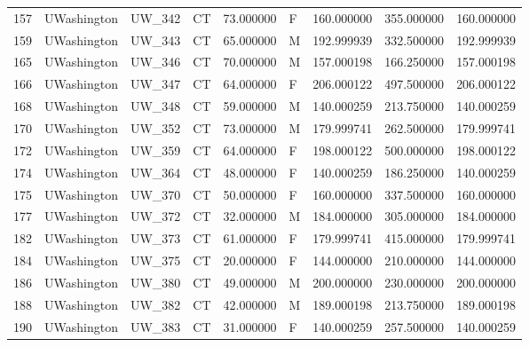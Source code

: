 \begin{tabular}{llllrlrrr}
157    &     UWashington &       UW\_342 &                 CT &  73.000000 &        F &       160.000000 &    355.000000 &  160.000000 \\
159    &     UWashington &       UW\_343 &                 CT &  65.000000 &        M &       192.999939 &    332.500000 &  192.999939 \\
165    &     UWashington &       UW\_346 &                 CT &  70.000000 &        M &       157.000198 &    166.250000 &  157.000198 \\
166    &     UWashington &       UW\_347 &                 CT &  64.000000 &        F &       206.000122 &    497.500000 &  206.000122 \\
168    &     UWashington &       UW\_348 &                 CT &  59.000000 &        M &       140.000259 &    213.750000 &  140.000259 \\
170    &     UWashington &       UW\_352 &                 CT &  73.000000 &        M &       179.999741 &    262.500000 &  179.999741 \\
172    &     UWashington &       UW\_359 &                 CT &  64.000000 &        F &       198.000122 &    500.000000 &  198.000122 \\
174    &     UWashington &       UW\_364 &                 CT &  48.000000 &        F &       140.000259 &    186.250000 &  140.000259 \\
175    &     UWashington &       UW\_370 &                 CT &  50.000000 &        F &       160.000000 &    337.500000 &  160.000000 \\
177    &     UWashington &       UW\_372 &                 CT &  32.000000 &        M &       184.000000 &    305.000000 &  184.000000 \\
182    &     UWashington &       UW\_373 &                 CT &  61.000000 &        F &       179.999741 &    415.000000 &  179.999741 \\
184    &     UWashington &       UW\_375 &                 CT &  20.000000 &        F &       144.000000 &    210.000000 &  144.000000 \\
186    &     UWashington &       UW\_380 &                 CT &  49.000000 &        M &       200.000000 &    230.000000 &  200.000000 \\
188    &     UWashington &       UW\_382 &                 CT &  42.000000 &        M &       189.000198 &    213.750000 &  189.000198 \\
190    &     UWashington &       UW\_383 &                 CT &  31.000000 &        F &       140.000259 &    257.500000 &  140.000259 \\

\end{tabular}
